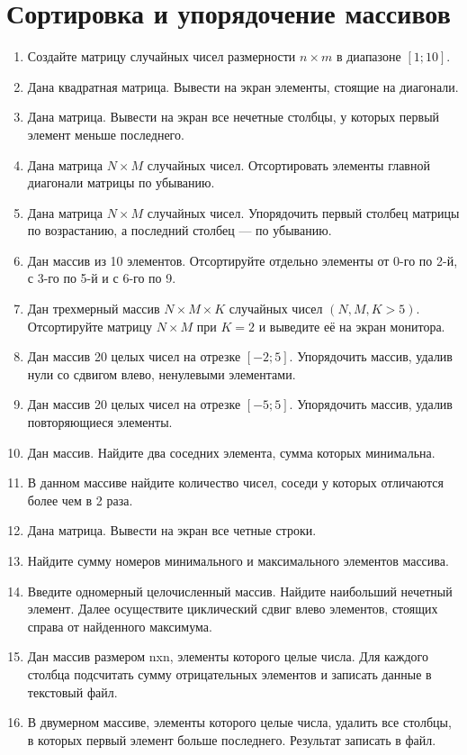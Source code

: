 \section{Сортировка и упорядочение массивов}
\begin{enumerate}[leftmargin=*]
    \item Создайте матрицу случайных чисел размерности $n \times m$ в диапазоне $[1;10]$.
    \item Дана квадратная матрица. Вывести на экран элементы, стоящие на диагонали.
    \item Дана матрица. Вывести на экран все нечетные столбцы, у которых первый элемент меньше последнего.
    \item Дана матрица $N\times M$ случайных чисел. Отсортировать элементы главной диагонали матрицы по убыванию.
    \item Дана матрица $N\times M$ случайных чисел. Упорядочить первый столбец матрицы по возрастанию, а последний столбец --- по убыванию.
    \item Дан массив из 10 элементов. Отсортируйте отдельно элементы от 0-го по 2-й, с 3-го по 5-й и с 6-го по 9.
    \item Дан трехмерный массив $N\times M\times K$ случайных чисел $(N, M, K>5)$. Отсортируйте матрицу $N\times M$ при $K=2$ и выведите её на экран монитора.
    \item Дан массив 20 целых чисел на отрезке $[-2;5]$. Упорядочить массив, удалив нули со сдвигом влево, ненулевыми элементами.
    \item Дан массив 20 целых чисел на отрезке $[-5;5]$. Упорядочить массив, удалив повторяющиеся элементы.
    \item Дан массив. Найдите два соседних элемента, сумма которых минимальна.
    \item В данном массиве найдите количество чисел, соседи у которых отличаются более чем в 2 раза.
    \item Дана матрица. Вывести на экран все четные строки.
    \item Найдите сумму номеров минимального и максимального элементов массива.
    \item Введите одномерный целочисленный массив. Найдите наибольший нечетный элемент. Далее осуществите циклический сдвиг влево элементов, стоящих справа от найденного максимума.
    \item Дан массив размером nxn, элементы которого целые числа. Для каждого столбца подсчитать сумму отрицательных элементов и записать данные в текстовый файл.
    \item В двумерном массиве, элементы которого целые числа, удалить все столбцы, в которых первый элемент больше последнего. Результат записать в файл.
\end{enumerate}